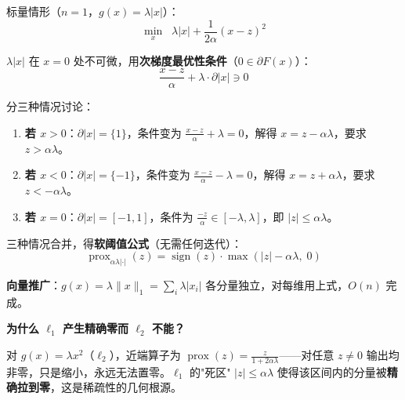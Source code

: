 \documentclass[12pt, a4paper]{ctexart}
\begin{document}
\begin{blackboard}

标量情形（$n=1$，$g(x) = \lambda|x|$）：
\[
\min_x \;\; \lambda|x| + \frac{1}{2\alpha}(x - z)^2
\]

$\lambda|x|$ 在 $x=0$ 处不可微，用\textbf{次梯度最优性条件}（$0 \in \partial F(x)$）：
\[
\frac{x - z}{\alpha} + \lambda \cdot \partial|x| \ni 0
\]

分三种情况讨论：

\begin{enumerate}
    \item \textbf{若 $x > 0$}：$\partial|x| = \{1\}$，条件变为 $\frac{x-z}{\alpha} + \lambda = 0$，解得 $x = z - \alpha\lambda$，要求 $z > \alpha\lambda$。
    \item \textbf{若 $x < 0$}：$\partial|x| = \{-1\}$，条件变为 $\frac{x-z}{\alpha} - \lambda = 0$，解得 $x = z + \alpha\lambda$，要求 $z < -\alpha\lambda$。
    \item \textbf{若 $x = 0$}：$\partial|x| = [-1,1]$，条件为 $\frac{-z}{\alpha} \in [-\lambda, \lambda]$，即 $|z| \leq \alpha\lambda$。
\end{enumerate}

三种情况合并，得\textbf{软阈值公式}（无需任何迭代）：
\[
\operatorname{prox}_{\alpha\lambda|\cdot|}(z) = \operatorname{sign}(z)\cdot\max(|z| - \alpha\lambda,\; 0)
\]

\textbf{向量推广}：$g(x) = \lambda\|x\|_1 = \sum_i\lambda|x_i|$ 各分量独立，对每维用上式，$O(n)$ 完成。

\textbf{为什么 $\ell_1$ 产生精确零而 $\ell_2$ 不能？}

对 $g(x) = \lambda x^2$（$\ell_2$），近端算子为 $\operatorname{prox}(z) = \frac{z}{1+2\alpha\lambda}$——对任意 $z \neq 0$ 输出均非零，只是缩小，永远无法置零。$\ell_1$ 的"死区" $|z| \leq \alpha\lambda$ 使得该区间内的分量被\textbf{精确拉到零}，这是稀疏性的几何根源。

\end{blackboard}
\end{document}

